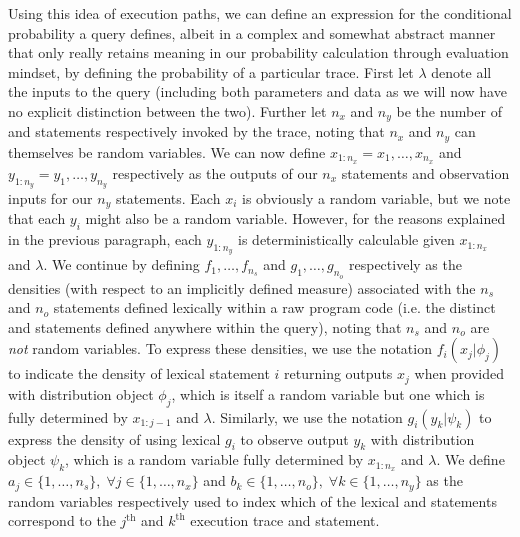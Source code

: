 Using this idea of execution paths, we can define an expression for the conditional probability a query defines,
albeit in a complex and somewhat abstract manner that only really retains meaning in our probability calculation through
evaluation mindset, by defining the probability of a particular trace.  First let $\lambda$ denote all the 
inputs to the query (including both parameters and
data as we will now have no explicit distinction between the two).  Further let
$n_x$ and $n_y$ be the number of \sample and \observe statements
respectively invoked by the trace, noting that $n_x$ and $n_y$ can themselves be random variables.
We can now define $x_{1:n_x} = x_1,\dots,x_{n_x}$ and $y_{1:n_y} = y_1,\dots,y_{n_y}$ respectively as the
outputs of our $n_x$ \sample statements and observation inputs for our $n_y$ \observe statements.
Each $x_{i}$ is obviously a random variable, but we note that each $y_i$ might also be a random variable.  However,
for the reasons explained in the previous paragraph, each $y_{1:n_y}$ is deterministically calculable given 
$x_{1:n_x}$ and $\lambda$.
We continue by defining $f_{1},\dots,f_{n_s}$ and $g_{1},\dots,g_{n_o}$ respectively as the densities (with respect to
an implicitly defined measure) associated with the $n_s$ \sample 
and $n_o$ \observe statements defined lexically within a raw program code (i.e. the distinct \sample and \observe
statements defined anywhere within the query), noting that $n_s$ and $n_o$ are \emph{not} random variables.
To express these densities, we use the notation $f_i(x_j|\phi_j)$ 
to indicate the density of lexical \sample statement $i$ returning outputs $x_j$ when provided
with distribution object $\phi_j$, which is itself a random variable but one which is fully determined by
$x_{1:j-1}$ and $\lambda$.  Similarly, we use the notation $g_i(y_k|\psi_k)$ to express the density of
using lexical \observe $g_i$ to observe output $y_k$ with distribution object $\psi_k$, which is a random
variable fully determined by $x_{1:n_x}$ and $\lambda$.  We define $a_j \in \{1,\dots,n_s\}, \; 
\forall j\in\{1,\dots,n_x\}$ and $b_k \in \{1,\dots,n_o\}, \; \forall k\in\{1,\dots,n_y\}$ as the
random variables respectively used to index which of the lexical \sample and \observe statements
correspond to the $j^{\text{th}}$ and $k^{\text{th}}$ execution trace \sample and \observe statement.

